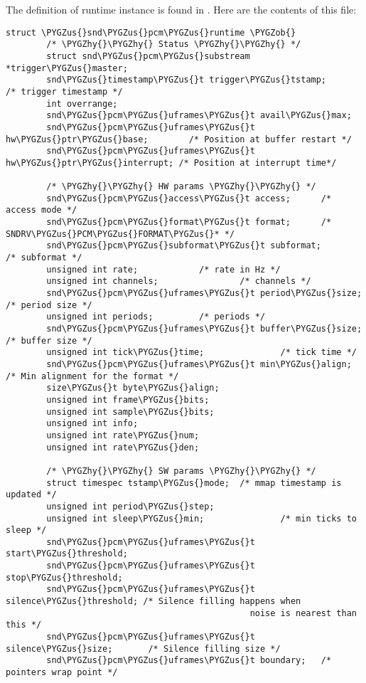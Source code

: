 \documentclass[a4paper,8pt,english]{sphinxmanual}
\def\PYGZus{\char`\_}
\def\PYGZob{\char`\{}
\def\PYGZhy{\char`\-}
\begin{document}
The definition of runtime instance is found in . Here
are the contents of this file:

\begin{Verbatim}[commandchars=\\\{\}]
struct \PYGZus{}snd\PYGZus{}pcm\PYGZus{}runtime \PYGZob{}
        /* \PYGZhy{}\PYGZhy{} Status \PYGZhy{}\PYGZhy{} */
        struct snd\PYGZus{}pcm\PYGZus{}substream *trigger\PYGZus{}master;
        snd\PYGZus{}timestamp\PYGZus{}t trigger\PYGZus{}tstamp;       /* trigger timestamp */
        int overrange;
        snd\PYGZus{}pcm\PYGZus{}uframes\PYGZus{}t avail\PYGZus{}max;
        snd\PYGZus{}pcm\PYGZus{}uframes\PYGZus{}t hw\PYGZus{}ptr\PYGZus{}base;        /* Position at buffer restart */
        snd\PYGZus{}pcm\PYGZus{}uframes\PYGZus{}t hw\PYGZus{}ptr\PYGZus{}interrupt; /* Position at interrupt time*/

        /* \PYGZhy{}\PYGZhy{} HW params \PYGZhy{}\PYGZhy{} */
        snd\PYGZus{}pcm\PYGZus{}access\PYGZus{}t access;      /* access mode */
        snd\PYGZus{}pcm\PYGZus{}format\PYGZus{}t format;      /* SNDRV\PYGZus{}PCM\PYGZus{}FORMAT\PYGZus{}* */
        snd\PYGZus{}pcm\PYGZus{}subformat\PYGZus{}t subformat;        /* subformat */
        unsigned int rate;            /* rate in Hz */
        unsigned int channels;                /* channels */
        snd\PYGZus{}pcm\PYGZus{}uframes\PYGZus{}t period\PYGZus{}size;        /* period size */
        unsigned int periods;         /* periods */
        snd\PYGZus{}pcm\PYGZus{}uframes\PYGZus{}t buffer\PYGZus{}size;        /* buffer size */
        unsigned int tick\PYGZus{}time;               /* tick time */
        snd\PYGZus{}pcm\PYGZus{}uframes\PYGZus{}t min\PYGZus{}align;  /* Min alignment for the format */
        size\PYGZus{}t byte\PYGZus{}align;
        unsigned int frame\PYGZus{}bits;
        unsigned int sample\PYGZus{}bits;
        unsigned int info;
        unsigned int rate\PYGZus{}num;
        unsigned int rate\PYGZus{}den;

        /* \PYGZhy{}\PYGZhy{} SW params \PYGZhy{}\PYGZhy{} */
        struct timespec tstamp\PYGZus{}mode;  /* mmap timestamp is updated */
        unsigned int period\PYGZus{}step;
        unsigned int sleep\PYGZus{}min;               /* min ticks to sleep */
        snd\PYGZus{}pcm\PYGZus{}uframes\PYGZus{}t start\PYGZus{}threshold;
        snd\PYGZus{}pcm\PYGZus{}uframes\PYGZus{}t stop\PYGZus{}threshold;
        snd\PYGZus{}pcm\PYGZus{}uframes\PYGZus{}t silence\PYGZus{}threshold; /* Silence filling happens when
                                                noise is nearest than this */
        snd\PYGZus{}pcm\PYGZus{}uframes\PYGZus{}t silence\PYGZus{}size;       /* Silence filling size */
        snd\PYGZus{}pcm\PYGZus{}uframes\PYGZus{}t boundary;   /* pointers wrap point */


\end{Verbatim}
\end{document}

